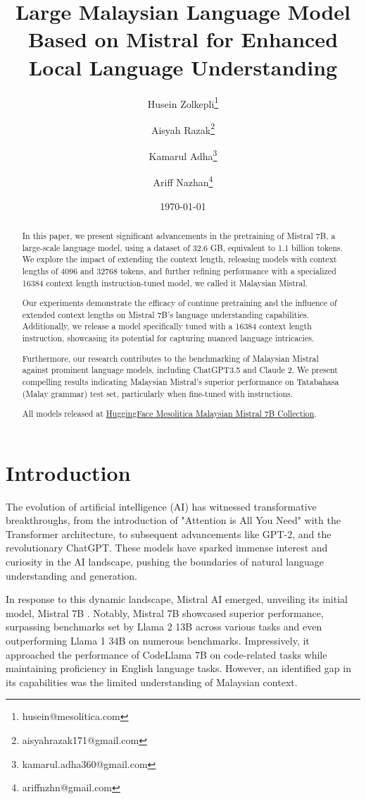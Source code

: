 \documentclass{article}
\title{Large Malaysian Language Model Based on Mistral for Enhanced Local Language Understanding}
\author{
  Husein Zolkepli\thanks{husein@mesolitica.com} \and 
  Aisyah Razak\thanks{aisyahrazak171@gmail.com} \and
  Kamarul Adha\thanks{kamarul.adha360@gmail.com} \and
  Ariff Nazhan\thanks{ariffnzhn@gmail.com}
}
\date{\today}
\begin{document}
\maketitle

\begin{abstract}
  In this paper, we present significant advancements in the pretraining of Mistral 7B, a large-scale language model, using a dataset of 32.6 GB, equivalent to 1.1 billion tokens. We explore the impact of extending the context length, releasing models with context lengths of 4096 and 32768 tokens, and further refining performance with a specialized 16384 context length instruction-tuned model, we called it Malaysian Mistral.

  Our experiments demonstrate the efficacy of continue pretraining and the influence of extended context lengths on Mistral 7B's language understanding capabilities. Additionally, we release a model specifically tuned with a 16384 context length instruction, showcasing its potential for capturing nuanced language intricacies.

  Furthermore, our research contributes to the benchmarking of Malaysian Mistral against prominent language models, including ChatGPT3.5 and Claude 2. We present compelling results indicating Malaysian Mistral's superior performance on Tatabahasa (Malay grammar) test set, particularly when fine-tuned with instructions.

  All models released at \href{https://huggingface.co/collections/mesolitica/malaysian-mistral-7b-6528f2ec825f4bba46c1700c}{HuggingFace Mesolitica Malaysian Mistral 7B Collection}.
\end{abstract}

\section{Introduction}
The evolution of artificial intelligence (AI) has witnessed transformative breakthroughs, from the introduction of "Attention is All You Need" \cite{vaswani2023attention} with the Transformer architecture, to subsequent advancements like GPT-2, and the revolutionary ChatGPT. These models have sparked immense interest and curiosity in the AI landscape, pushing the boundaries of natural language understanding and generation.

In response to this dynamic landscape, Mistral AI emerged, unveiling its initial model, Mistral 7B \cite{jiang2023mistral}. Notably, Mistral 7B showcased superior performance, surpassing benchmarks set by Llama 2 13B across various tasks and even outperforming Llama 1 34B on numerous benchmarks. Impressively, it approached the performance of CodeLlama 7B on code-related tasks while maintaining proficiency in English language tasks. However, an identified gap in its capabilities was the limited understanding of Malaysian context.
\end{document}
